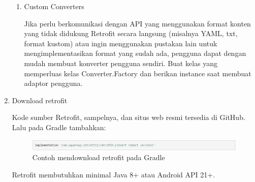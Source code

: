\begin{enumerate}
\begin{enumerate}
	\item Custom Converters
	
	Jika perlu berkomunikasi dengan API yang menggunakan format konten yang tidak didukung Retrofit secara langsung (misalnya YAML, txt, format kustom) atau ingin menggunakan pustakan lain untuk mengimplementasikan format yang sudah ada, pengguna dapat dengan mudah membuat konverter pengguna sendiri. Buat kelas yang memperluas kelas Converter.Factory dan berikan instance saat membuat adaptor pengguna.
	\end{enumerate}

\item Download retrofit

Kode sumber Retrofit, sampelnya, dan situs web resmi tersedia di GitHub. Lalu pada Gradle tambahkan:
\begin{figure}[H]
	\centering
	\includegraphics[keepaspectratio, width=12cm]{gambar/retrofit17}
	\caption{Contoh mendownload retrofit pada Gradle \citep{developerandroid}}
	\label{gambar:gambar_65}
\end{figure}

Retrofit membutuhkan minimal Java 8+ atau Android API 21+.
\end{enumerate}

